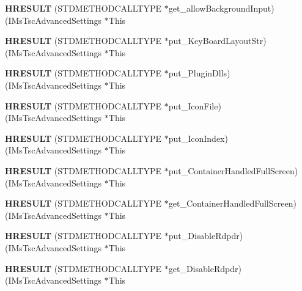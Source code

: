\begin{DoxyCompactItemize}
{\bfseries H\+R\+E\+S\+U\+LT} (S\+T\+D\+M\+E\+T\+H\+O\+D\+C\+A\+L\+L\+T\+Y\+PE $\ast$get\+\_\+allow\+Background\+Input)(I\+Ms\+Tsc\+Advanced\+Settings $\ast$This
\item 
\mbox{\label{struct_i_ms_tsc_advanced_settings_vtbl_ae9771e869b2650e21c014adf0be55596}} 
{\bfseries H\+R\+E\+S\+U\+LT} (S\+T\+D\+M\+E\+T\+H\+O\+D\+C\+A\+L\+L\+T\+Y\+PE $\ast$put\+\_\+\+Key\+Board\+Layout\+Str)(I\+Ms\+Tsc\+Advanced\+Settings $\ast$This
\item 
\mbox{\label{struct_i_ms_tsc_advanced_settings_vtbl_ae61bfe43ff488ae80c6aa6dcd48f586d}} 
{\bfseries H\+R\+E\+S\+U\+LT} (S\+T\+D\+M\+E\+T\+H\+O\+D\+C\+A\+L\+L\+T\+Y\+PE $\ast$put\+\_\+\+Plugin\+Dlls)(I\+Ms\+Tsc\+Advanced\+Settings $\ast$This
\item 
\mbox{\label{struct_i_ms_tsc_advanced_settings_vtbl_ab09050f364e1f807ed9579ff7262d1a1}} 
{\bfseries H\+R\+E\+S\+U\+LT} (S\+T\+D\+M\+E\+T\+H\+O\+D\+C\+A\+L\+L\+T\+Y\+PE $\ast$put\+\_\+\+Icon\+File)(I\+Ms\+Tsc\+Advanced\+Settings $\ast$This
\item 
\mbox{\label{struct_i_ms_tsc_advanced_settings_vtbl_a236568877d867f6bacbde146777a487c}} 
{\bfseries H\+R\+E\+S\+U\+LT} (S\+T\+D\+M\+E\+T\+H\+O\+D\+C\+A\+L\+L\+T\+Y\+PE $\ast$put\+\_\+\+Icon\+Index)(I\+Ms\+Tsc\+Advanced\+Settings $\ast$This
\item 
\mbox{\label{struct_i_ms_tsc_advanced_settings_vtbl_a3a60ee12f15c8e1a6a5498db5c8c639b}} 
{\bfseries H\+R\+E\+S\+U\+LT} (S\+T\+D\+M\+E\+T\+H\+O\+D\+C\+A\+L\+L\+T\+Y\+PE $\ast$put\+\_\+\+Container\+Handled\+Full\+Screen)(I\+Ms\+Tsc\+Advanced\+Settings $\ast$This
\item 
\mbox{\label{struct_i_ms_tsc_advanced_settings_vtbl_a79226b6493c2df0b98d5ab71982f153c}} 
{\bfseries H\+R\+E\+S\+U\+LT} (S\+T\+D\+M\+E\+T\+H\+O\+D\+C\+A\+L\+L\+T\+Y\+PE $\ast$get\+\_\+\+Container\+Handled\+Full\+Screen)(I\+Ms\+Tsc\+Advanced\+Settings $\ast$This
\item 
\mbox{\label{struct_i_ms_tsc_advanced_settings_vtbl_a615bdf6d487076addce9947dc121adaa}} 
{\bfseries H\+R\+E\+S\+U\+LT} (S\+T\+D\+M\+E\+T\+H\+O\+D\+C\+A\+L\+L\+T\+Y\+PE $\ast$put\+\_\+\+Disable\+Rdpdr)(I\+Ms\+Tsc\+Advanced\+Settings $\ast$This
\item 
\mbox{\label{struct_i_ms_tsc_advanced_settings_vtbl_ab6210e0f56e5f8ce18b0b2ba26af221f}} 
{\bfseries H\+R\+E\+S\+U\+LT} (S\+T\+D\+M\+E\+T\+H\+O\+D\+C\+A\+L\+L\+T\+Y\+PE $\ast$get\+\_\+\+Disable\+Rdpdr)(I\+Ms\+Tsc\+Advanced\+Settings $\ast$This
\end{DoxyCompactItemize}
